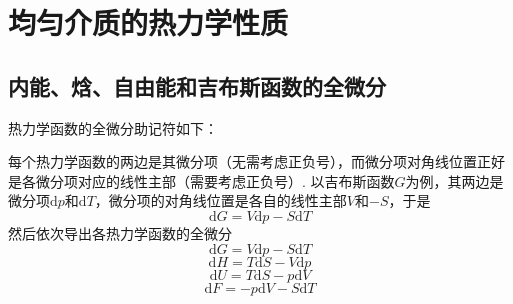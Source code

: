 \section{均匀介质的热力学性质}
\subsection{内能、焓、自由能和吉布斯函数的全微分}
热力学函数的全微分助记符如下：
\begin{center}
\end{center}
每个热力学函数的两边是其微分项（无需考虑正负号），而微分项对角线位置正好是各微分项对应的线性主部（需要考虑正负号）. 以吉布斯函数$G$为例，其两边是微分项$\mathrm{d}p$和$\mathrm{d}T$，微分项的对角线位置是各自的线性主部$V$和$-S$，于是
$$
    \mathrm{d}G = V\mathrm{d}p - S\mathrm{d}T
$$
然后依次导出各热力学函数的全微分
\begin{equation}\label{吉布斯函数的全微分}
    \mathrm{d}G = V\mathrm{d}p - S\mathrm{d}T
\end{equation}
\begin{equation}\label{焓的全微分}
    \mathrm{d}H = T\mathrm{d}S - V\mathrm{d}p
\end{equation}
\begin{equation}\label{内能的全微分}
    \mathrm{d}U = T\mathrm{d}S - p\mathrm{d}V
\end{equation}
\begin{equation}\label{自由能的全微分}
    \mathrm{d}F = -p\mathrm{d}V - S\mathrm{d}T
\end{equation}



